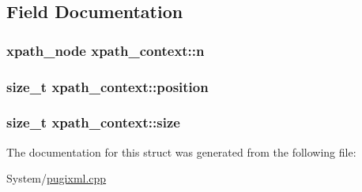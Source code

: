 \subsection{Field Documentation}
\hypertarget{structxpath__context_ace8fbb8121820bc5054605c166101273}{
\subsubsection[{n}]{\setlength{\rightskip}{0pt plus 5cm}xpath\-\_\-node xpath\-\_\-context\-::n}}\label{structxpath__context_ace8fbb8121820bc5054605c166101273}
\hypertarget{structxpath__context_add1fc9bd16b21d3a8d7a4bd63c60af07}{
\subsubsection[{position}]{\setlength{\rightskip}{0pt plus 5cm}size\-\_\-t xpath\-\_\-context\-::position}}\label{structxpath__context_add1fc9bd16b21d3a8d7a4bd63c60af07}
\hypertarget{structxpath__context_a976ffb0eff84a7779c97e589c1785d1c}{
\subsubsection[{size}]{\setlength{\rightskip}{0pt plus 5cm}size\-\_\-t xpath\-\_\-context\-::size}}\label{structxpath__context_a976ffb0eff84a7779c97e589c1785d1c}


The documentation for this struct was generated from the following file\-:\begin{DoxyCompactItemize}
\item 
System/\hyperlink{pugixml_8cpp}{pugixml.\-cpp}\end{DoxyCompactItemize}
